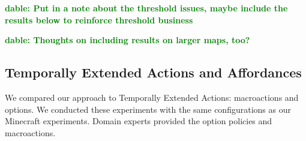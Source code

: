 \documentclass[letterpaper]{article}
\newcommand{\dnote}[1]{\textcolor{Green}{\textbf{dable:  #1}}}
\begin{document}
\dnote{Put in a note about the threshold issues, maybe include the results below to reinforce threshold business}

\dnote{Thoughts on including results on larger maps, too?}



\subsection{Temporally Extended Actions and Affordances}

We compared our approach to Temporally Extended Actions: macroactions
and options. We conducted these experiments with the same
configurations as our Minecraft experiments. Domain experts provided
the option policies and macroactions.
\end{document}
